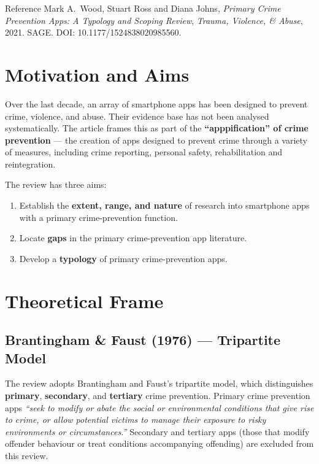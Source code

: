 \documentclass[11pt,a4paper,openany]{report}
\theoremstyle{definition}
\theoremstyle{plain}
\theoremstyle{remark}
\begin{document}
\begin{sourcebox}{Reference}
Mark A.\ Wood, Stuart Ross and Diana Johns, \textit{Primary Crime Prevention Apps: A Typology and Scoping Review}, \textit{Trauma, Violence, \& Abuse}, 2021. SAGE. DOI: 10.1177/1524838020985560.
\end{sourcebox}

\section{Motivation and Aims}

Over the last decade, an array of smartphone apps has been designed to prevent crime, violence, and abuse. Their evidence base has not been analysed systematically. The article frames this as part of the \textbf{``apppification'' of crime prevention} --- the creation of apps designed to prevent crime through a variety of measures, including crime reporting, personal safety, rehabilitation and reintegration.

The review has three aims:
\begin{enumerate}
    \item Establish the \textbf{extent, range, and nature} of research into smartphone apps with a primary crime-prevention function.
    \item Locate \textbf{gaps} in the primary crime-prevention app literature.
    \item Develop a \textbf{typology} of primary crime-prevention apps.
\end{enumerate}

\section{Theoretical Frame}

\subsection{Brantingham \& Faust (1976) --- Tripartite Model}

The review adopts Brantingham and Faust's tripartite model, which distinguishes \textbf{primary}, \textbf{secondary}, and \textbf{tertiary} crime prevention. Primary crime prevention apps \textit{``seek to modify or abate the social or environmental conditions that give rise to crime, or allow potential victims to manage their exposure to risky environments or circumstances.''} Secondary and tertiary apps (those that modify offender behaviour or treat conditions accompanying offending) are excluded from this review.
\end{document}
